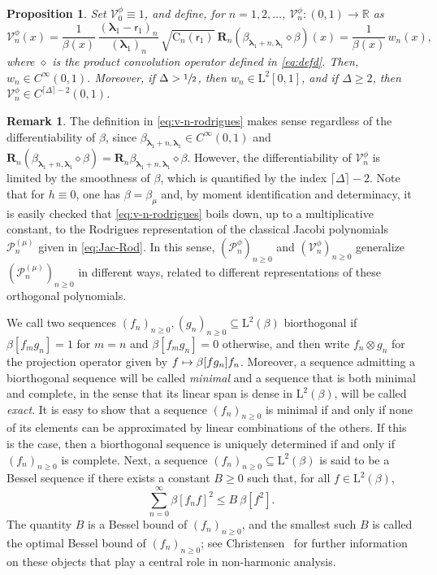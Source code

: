 \documentclass[10pt]{amsart}
\newcommand\mto{\mathchoice{\longmapsto}{\mapsto}{\mapsto}{\mapsto}}
\theoremstyle{plain}
\newtheorem{proposition}[theorem]{Proposition}
\theoremstyle{definition}
\newtheorem{remark}[theorem]{Remark}
\newcommand{\R}{\mathbb{R}}
\renewcommand{\P}{\mathcal{P}}
\newcommand{\V}{\mathcal{V}}
\newcommand{\Rc}{\mathbf{R}}
\newcommand{\C}{{\mathrm{C}}}
\newcommand{\Leb}{\mathrm{L}}
\newcommand{\lam}{{\bm{\lambda}_1}}
\newcommand{\vat}{{\mathsf{r}_1}}
\newcommand{\gab}[1][\lam,\mo]{{\beta_{#1}}}
\let\mo\mu
\let\bpsi\beta
\begin{document}
\begin{proposition}
\label{prop:co-eigenfunctions}
Set $\V_0^\phi \equiv 1$, and define, for $n = 1,2,\ldots$, $\V_n^\phi: (0,1) \to \R$ as
\begin{equation}
\label{eq:v-n-rodrigues}
\V_n^\phi(x) = \frac{1}{\bpsi(x)}\, \frac{(\lam-\vat)_n}{(\lam)_n}\,\sqrt{\C_n(\vat)} \ \Rc_n (\gab[\lam+n,\lam] \diamond \bpsi) (x) = \frac{1}{\bpsi(x)}\,w_n(x),
\end{equation}
where $\diamond$ is the product convolution operator defined in \eqref{eq:defd}.
Then, $w_n \in C^\infty(0,1)$. Moreover, if $\Delta > \sfrac{1}{2}$, then $w_n \in \Leb^2[0,1]$, and if
$\Delta \geq 2$, then $\V_n^\phi \in C^{\lceil \Delta \rceil - 2}(0,1)$.
\end{proposition}

\begin{remark}
The definition in \eqref{eq:v-n-rodrigues} makes sense regardless of the differentiability of $\bpsi$, since $\gab[\lam+n,\lam] \in C^\infty(0,1)$ and $\Rc_n (\gab[\lam+n,\lam] \diamond \bpsi) = \Rc_n \gab[\lam+n,\lam] \diamond \bpsi$. However, the differentiability of $\V_n^\phi$ is limited by the smoothness of $\bpsi$, which is quantified by the index $\lceil \Delta \rceil - 2$. Note that for $h \equiv 0$, one has $\bpsi = \gab[\mo]$ and, by moment identification and determinacy, it is easily checked that \eqref{eq:v-n-rodrigues} boils down, up to a multiplicative constant, to the Rodrigues representation of the classical Jacobi polynomials $\P_n^{(\mo)}$ given in \eqref{eq:Jac-Rod}. In this sense, $(\P_n^\phi)_{n \geq 0}$ and $(\V_n^\phi)_{n \geq 0}$ generalize $(\P_n^{(\mo)})_{n \geq 0}$ in different ways, related to different representations of these orthogonal polynomials.
\end{remark}

We call two sequences $(f_n)_{n \geq 0}, (g_n)_{n \geq 0} \subseteq \Leb^2(\bpsi)$ biorthogonal if $\bpsi [ f_mg_n ] = 1$ for
$m=n$ and $\bpsi [f_mg_n] = 0$ otherwise, and then write $f_n \otimes g_n$ for the projection operator given by $f \mto \bpsi[f g_n] f_n$. Moreover, a sequence admitting a biorthogonal sequence will be called \emph{minimal} and a sequence that is both minimal and complete, in the sense that its linear span is dense in $\Leb^2(\bpsi)$,
will be called \emph{exact}. It is easy to show that a sequence $(f_n)_{n \geq 0}$ is minimal if and only if none of
its elements can be approximated by linear combinations of the others. If this is the case, then
a biorthogonal sequence is uniquely determined if and only if $(f_n)_{n \geq 0}$ is complete.
Next, a sequence $(f_n)_{n \geq 0} \subseteq \Leb^2(\bpsi)$ is said to be a Bessel sequence if there exists
a constant $B \ge 0$ such that, for all $f \in \Leb^2(\bpsi)$,
\begin{equation*}
\sum_{n=0}^\infty \bpsi [f_n f]^2 \leq B \: \bpsi[f^2].
\end{equation*}
The quantity $B$ is a Bessel bound of $(f_n)_{n \geq 0}$, and the smallest such $B$ is called the optimal Bessel bound of $(f_n)_{n \geq 0}$; see \eg Christensen~\cite{Christensen2003a} for further information on these objects that play a central role in non-harmonic analysis.
\end{document}
